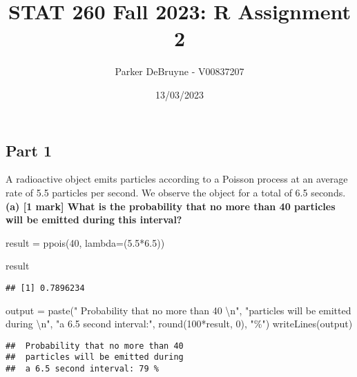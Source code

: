 \documentclass[
]{article}
\title{STAT 260 Fall 2023: R Assignment 2}
\author{Parker DeBruyne - V00837207}
\date{13/03/2023}
\newenvironment{Shaded}{\begin{snugshade}}{\end{snugshade}}
\newcommand{\AttributeTok}[1]{\textcolor[rgb]{0.77,0.63,0.00}{#1}}
\newcommand{\DecValTok}[1]{\textcolor[rgb]{0.00,0.00,0.81}{#1}}
\newcommand{\FloatTok}[1]{\textcolor[rgb]{0.00,0.00,0.81}{#1}}
\newcommand{\FunctionTok}[1]{\textcolor[rgb]{0.00,0.00,0.00}{#1}}
\newcommand{\NormalTok}[1]{#1}
\newcommand{\OtherTok}[1]{\textcolor[rgb]{0.56,0.35,0.01}{#1}}
\newcommand{\SpecialCharTok}[1]{\textcolor[rgb]{0.00,0.00,0.00}{#1}}
\newcommand{\StringTok}[1]{\textcolor[rgb]{0.31,0.60,0.02}{#1}}
\begin{document}
\maketitle

\hypertarget{part-1}{%
\subsection{Part 1}\label{part-1}}

A radioactive object emits particles according to a Poisson process at
an average rate of 5.5 particles per second. We observe the object for a
total of 6.5 seconds. \newline \newline \textbf{(a) {[}1 mark{]} What is
the probability that no more than 40 particles will be emitted during
this interval?}

\begin{Shaded}
\begin{Highlighting}[]
\NormalTok{result }\OtherTok{=} \FunctionTok{ppois}\NormalTok{(}\DecValTok{40}\NormalTok{, }\AttributeTok{lambda=}\NormalTok{(}\FloatTok{5.5}\SpecialCharTok{*}\FloatTok{6.5}\NormalTok{))}

\NormalTok{result}
\end{Highlighting}
\end{Shaded}

\begin{verbatim}
## [1] 0.7896234
\end{verbatim}

\begin{Shaded}
\begin{Highlighting}[]
\NormalTok{output }\OtherTok{=} \FunctionTok{paste}\NormalTok{(}\StringTok{" Probability that no more than 40 }\SpecialCharTok{\textbackslash{}n}\StringTok{"}\NormalTok{,}
               \StringTok{"particles will be emitted during }\SpecialCharTok{\textbackslash{}n}\StringTok{"}\NormalTok{, }
               \StringTok{"a 6.5 second interval:"}\NormalTok{,}
               \FunctionTok{round}\NormalTok{(}\DecValTok{100}\SpecialCharTok{*}\NormalTok{result, }\DecValTok{0}\NormalTok{), }\StringTok{"\%"}\NormalTok{)}
\FunctionTok{writeLines}\NormalTok{(output)}
\end{Highlighting}
\end{Shaded}

\begin{verbatim}
##  Probability that no more than 40 
##  particles will be emitted during 
##  a 6.5 second interval: 79 %
\end{verbatim}
\end{document}
